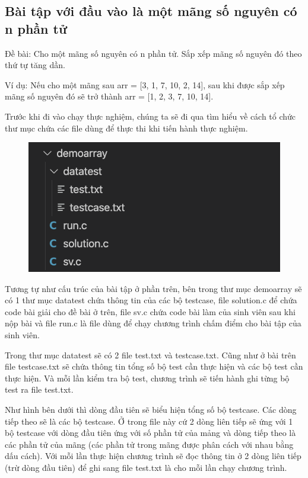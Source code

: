 \documentclass[12pt,a4paper]{article}
\begin{document}
\subsection{Bài tập với đầu vào là một mãng số nguyên có n phần tử}

Đề bài: Cho một mãng số nguyên có n phần tử. Sắp xếp mãng số nguyên đó theo thứ tự tăng dần.

Ví dụ: Nếu cho một mãng sau arr = [3, 1, 7, 10, 2, 14], sau khi được sắp xếp mãng số nguyên đó sẽ trở thành arr = [1, 2, 3, 7, 10, 14].

Trước khi đi vào chạy thực nghiệm, chúng ta sẽ đi qua tìm hiểu về cách tổ chức thư mục chứa các file dùng để thực thi khi tiến hành thực nghiệm.

\begin{figure}[ht]
\begin{center}
\includegraphics[scale=.3]{hinhanh/cautrucdemoarray.png}
\end{center}
\end{figure}

Tương tự như cấu trúc của bài tập ở phần trên, bên trong thư mục demoarray sẽ có 1 thư mục datatest chứa thông tin của các bộ testcase, file solution.c để chứa code bài giải cho đề bài ở trên, file sv.c chứa code bài làm của sinh viên sau khi nộp bài và file run.c là file dùng để chạy chương trình chấm điểm cho bài tập của sinh viên.

Trong thư mục datatest sẽ có 2 file test.txt và testcase.txt. Cũng như ở bài trên file testcase.txt sẽ chứa thông tin tổng số bộ test cần thực hiện và các bộ test cần thực hiện. Và mỗi lần kiểm tra bộ test, chương trình sẽ tiến hành ghi từng bộ test ra file test.txt.

Như hình bên dưới thì dòng đầu tiên sẽ biểu hiện tổng số bộ testcase. Các dòng tiếp theo sẽ là các bộ testcase. Ở trong file này cứ 2 dòng liên tiếp sẽ ứng với 1 bộ testcase với dòng đầu tiên ứng với số phần tử của mảng và dòng tiếp theo là các phần tử của mãng (các phần tử trong mãng được phân cách với nhau bằng dấu cách). Với mỗi lần thực hiện chương trình sẽ đọc thông tin ở 2 dòng liên tiếp (trừ dòng đầu tiên) để ghi sang file test.txt là cho mỗi lần chạy chương trình.
\end{document}
